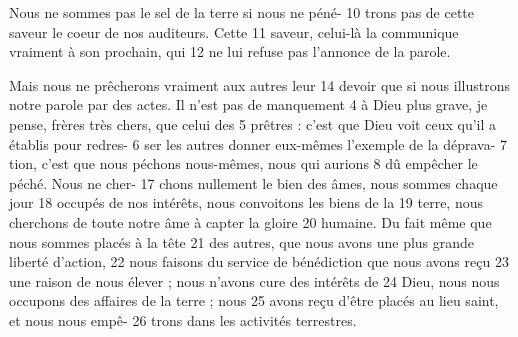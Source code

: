 Nous ne sommes pas le sel de la terre si nous ne péné-	 
10	 	trons pas de cette saveur le coeur de nos auditeurs. Cette	 
11	 	saveur, celui-là la communique vraiment à son prochain, qui	 
12	 	ne lui refuse pas l'annonce de la parole.

Mais nous ne prêcherons vraiment aux autres leur	 
14	 	devoir que si nous illustrons notre parole par des actes.
Il n'est pas de manquement	 
4	 	à Dieu plus grave, je pense, frères très chers, que celui des	 
5	 	prêtres : c'est que Dieu voit ceux qu'il a établis pour redres-	 
6	 	ser les autres donner eux-mêmes l'exemple de la déprava-	 
7	 	tion, c'est que nous péchons nous-mêmes, nous qui aurions	 
8	 	dû empêcher le péché. Nous ne cher-	 
17	 	chons nullement le bien des âmes, nous sommes chaque jour	 
18	 	occupés de nos intérêts, nous convoitons les biens de la	 
19	 	terre, nous cherchons de toute notre âme à capter la gloire	 
20	 	humaine. Du fait même que nous sommes placés à la tête	 
21	 	des autres, que nous avons une plus grande liberté d'action,	 
22	 	nous faisons du service de bénédiction que nous avons reçu	 
23	 	une raison de nous élever ; nous n'avons cure des intérêts de	 
24	 	Dieu, nous nous occupons des affaires de la terre ; nous	 
25	 	avons reçu d'être placés au lieu saint, et nous nous empê-	 
26	 	trons dans les activités terrestres.
